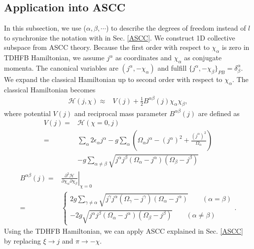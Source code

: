 \documentclass[%
superscriptaddress,
showpacs,
nofootinbib,
amsmath,amssymb,
aps,
prc,
twocolumn,
floatfix ]%
{revtex4-1}
\begin{document}
\subsection{Application into ASCC}
In this subsection, we use ($\alpha, \beta, \cdots$) to describe the degrees of freedom instead of $l$ to synchronize the notation with in Sec. \ref{ASCC}. 
We construct 1D collective subspace from ASCC theory. Because the first order with respect to $\chi_{\alpha}$ is zero in TDHFB Hamiltonian, we assume $j^{\alpha}$ as coordinates and $\chi_{\alpha}$ as conjugate momenta. The canonical variables are $(j^{\alpha},-\chi_{\alpha})$ and fulfill $\{j^{\alpha},-\chi_{\beta}\}_{PB}=\delta^{\alpha}_{\beta}$. We expand the classical Hamiltonian up to second order with respect to $\chi_{\alpha}$. 
The classical Hamiltonian becomes
\begin{align}
  \mathcal{H}(j,\chi) \approx& V(j) + \frac{1}{2}B^{\alpha\beta}(j)\chi_{\alpha}\chi_{\beta},
\end{align}
where potential $V(j)$ and reciprocal mass parameter $B^{\alpha\beta}(j)$ are defined as
\begin{align}
  V(j) =& \mathcal{H}(\chi=0,j) \nonumber \\
	=& \sum_{\alpha} 2\epsilon_{\alpha}j^{\alpha} - g\sum_{\alpha} \left( \Omega_{\alpha}j^{\alpha} - (j^{\alpha})^2 +\frac{(j^{\alpha})^2}{\Omega_{\alpha}} \right) \nonumber \\
  &- g\sum_{\alpha\ne \beta} \sqrt{j^{\alpha}j^{\beta}(\Omega_{\alpha}-j^{\alpha})(\Omega_{\beta}-j^{\beta})} 	
\end{align}
\begin{align}
  B^{\alpha\beta}(j) =& \left. \frac{\partial^2\mathcal{H}}{\partial\chi_{\alpha}\partial\chi_{\beta}} \right|_{\chi=0} \nonumber \\
	=& \left\{
	\begin{array}{c}
	2g\sum_{\gamma\ne \alpha} \sqrt{j^{\gamma}j^{\alpha}(\Omega_{\gamma}-j^{\gamma})(\Omega_{\alpha}-j^{\alpha})} \hspace{2em} (\alpha=\beta) \\
	-2g\sqrt{j^{\alpha}j^{\beta}(\Omega_{\alpha}-j^{\alpha})(\Omega_{\beta}-j^{\beta})} \hspace{2em} (\alpha\ne\beta)
	\end{array}
	\right. .
 \label{mass}
\end{align}
Using the TDHFB Hamiltonian, we can apply ASCC explained in Sec. \ref{ASCC} by replacing $\xi\to j$ and $\pi\to-\chi$.
\end{document}
